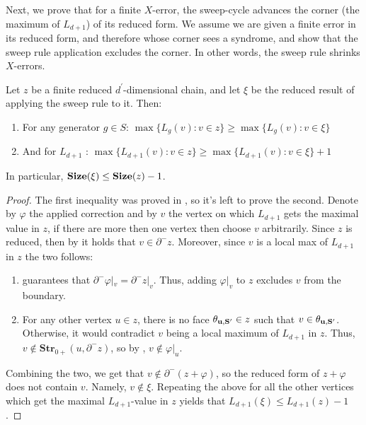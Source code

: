 Next, we prove that for a finite $X$-error, the sweep-cycle advances the corner (the maximum of $L_{d+1}$) of its reduced form. We assume we are given a finite error in its reduced form, and therefore whose corner sees a syndrome, and show that the sweep rule application excludes the corner. In other words, the sweep rule shrinks $X$-errors.

\begin{claim}
  \label{claim:sweepshrink}
Let $z$ be a finite reduced $d^{\prime}$-dimensional chain, and let $\xi$ be the reduced result of applying the sweep rule to it. Then:
  \begin{enumerate}
    \item For any generator $g \in S$: $\max \big\{ L_{g}(v) : v \in z \big\} \ge \max \big\{ L_{g}(v) : v \in \xi \big\}  $
    \item And for $L_{d+1}$ : $ \max \big\{ L_{d+1}(v)  : v \in z \big\} \ge \max \big\{  L_{d+1}(v) : v \in \xi \big\} + 1$
  \end{enumerate}
  In particular, $\mathbf{Size}(\xi) \le \mathbf{Size}(z) - 1$.
\end{claim}
\begin{proof}
  The first inequality was proved in , so it's left to prove the second. Denote by $\varphi$ the applied correction and by $v$ the vertex on which $L_{d+1}$ gets the maximal value in $z$, if there are more then one vertex then choose $v$ arbitrarily. Since $z$ is reduced, then by  it holds that $v \in \partial^{-} z$. Moreover, since $v$ is a local max of $L_{d+1}$ in $z$ the two follows: 
  \begin{enumerate}
      \item {} guarantees that $\partial^{-} \varphi|_{v} = \partial^{-} z|_{v}$. Thus, adding $\varphi|_{v}$ to $z$ excludes $v$ from the boundary.
      \item For any other vertex $u \in z$, there is no face $\mathbf{\theta_{u ,S^{\prime}} } \in z$ such that $v \in \mathbf{\theta_{u ,S^{\prime}} }$. Otherwise, it would contradict $v$ being a local maximum of $L_{d+1}$ in $z$. Thus, $v \notin \textbf{Str}_{0+}(u, \partial^{-} z)$, so by , $v \notin \varphi|_{u}$.
  \end{enumerate}
Combining the two, we get that $v \notin \partial^{-} (z + \varphi)$, so the reduced form of $z + \varphi$ does not contain $v$. Namely, $v \notin \xi$. Repeating the above for all the other vertices which get the maximal $L_{d+1}$-value in $z$ yields that $L_{d+1}(\xi) \le L_{d+1}(z) - 1$.

\end{proof}

